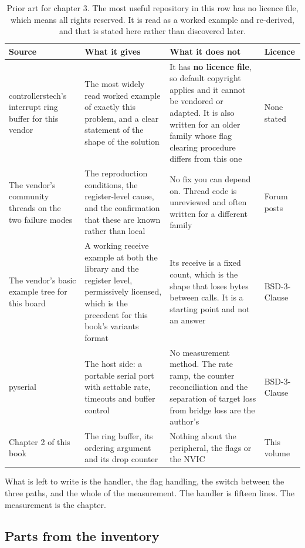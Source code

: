 \begin{table}[H]\centering\small
\begin{tabular}{p{34mm}p{46mm}p{38mm}p{20mm}}
\toprule
Source & What it gives & What it does not & Licence \\
\midrule
controllerstech's interrupt ring buffer for this vendor & The most widely read worked example of exactly this problem, and a clear statement of the shape of the solution & It has \textbf{no licence file}, so default copyright applies and it cannot be vendored or adapted. It is also written for an older family whose flag clearing procedure differs from this one & None stated \\
The vendor's community threads on the two failure modes & The reproduction conditions, the register-level cause, and the confirmation that these are known rather than local & No fix you can depend on. Thread code is unreviewed and often written for a different family & Forum posts \\
The vendor's basic example tree for this board & A working receive example at both the library and the register level, permissively licensed, which is the precedent for this book's variants format & Its receive is a fixed count, which is the shape that loses bytes between calls. It is a starting point and not an answer & BSD-3-Clause \\
pyserial & The host side: a portable serial port with settable rate, timeouts and buffer control & No measurement method. The rate ramp, the counter reconciliation and the separation of target loss from bridge loss are the author's & BSD-3-Clause \\
Chapter 2 of this book & The ring buffer, its ordering argument and its drop counter & Nothing about the peripheral, the flags or the NVIC & This volume \\
\bottomrule
\end{tabular}
\caption{Prior art for chapter 3. The most useful repository in this row has no licence file, which means all rights reserved. It is read as a worked example and re-derived, and that is stated here rather than discovered later.}
\end{table}

What is left to write is the handler, the flag handling, the switch between the
three paths, and the whole of the measurement. The handler is fifteen lines. The
measurement is the chapter.

\subsection*{Parts from the inventory}

